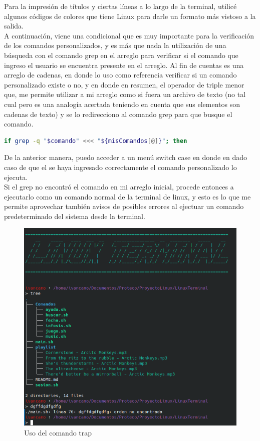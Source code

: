 \documentclass[letter,11pt]{article}
\begin{document}
Para la impresión de títulos y ciertas líneas a lo largo de la terminal, utilicé algunos códigos de colores que tiene Linux para darle un formato más vistoso a la salida. \\
A continuación, viene una condicional que es muy importante para la verificación de los comandos personalizados, y es más que nada la utilización de una búsqueda con el comando grep en el arreglo para verificar si el comando que ingreso el usuario se encuentra presente en el arreglo. Al fin de cuentas es una arreglo de cadenas, en donde lo uso como referencia verificar si un comando personalizado existe o no, y en donde en resumen, el operador de triple menor que, me permite utilizar a mi arreglo como si fuera un archivo de texto (no tal cual pero es una analogía acertada teniendo en cuenta que sus elementos son cadenas de texto) y se lo redirecciono al comando grep para que busque el comando.\\

\begin{lstlisting}[language=sh, label={lst:shellscript}, basicstyle=\small]
if grep -q "$comando" <<< "${misComandos[@]}"; then
\end{lstlisting}

De la anterior manera, puedo acceder a un menú switch case en donde en dado caso de que el se haya ingresado correctamente el comando personalizado lo ejecuta.\\
Si el grep no encontró el comando en mi arreglo inicial, procede entonces a ejecutarlo como un comando normal de la terminal de linux, y esto es lo que me permite aprovechar también avisos de posibles errores al ejectuar un comando predeterminado del sistema desde la terminal.\\

\begin{figure} [H]
    \centering 
    \caption{Uso del comando trap}
    \includegraphics[scale=.4]{entrada.png} 
\end{figure}
\end{document}

